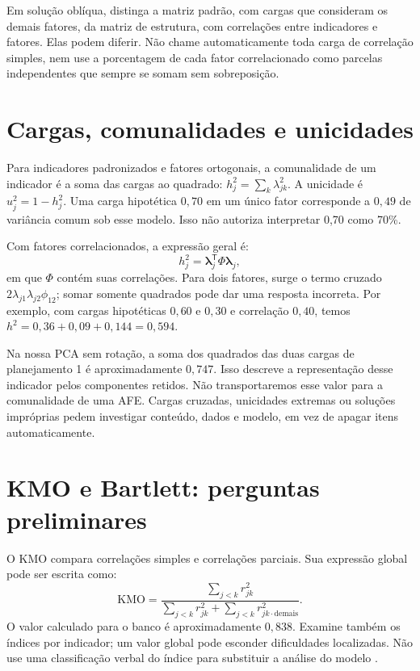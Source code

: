 Em solução oblíqua, distinga a matriz padrão, com cargas que consideram os demais fatores, da matriz de estrutura, com correlações entre indicadores e fatores. Elas podem diferir. Não chame automaticamente toda carga de correlação simples, nem use a porcentagem de cada fator correlacionado como parcelas independentes que sempre se somam sem sobreposição.

\section{Cargas, comunalidades e unicidades}

Para indicadores padronizados e fatores ortogonais, a comunalidade de um indicador é a soma das cargas ao quadrado: $h_j^2=\sum_k\lambda_{jk}^2$. A unicidade é $u_j^2=1-h_j^2$. Uma carga hipotética $0{,}70$ em um único fator corresponde a $0{,}49$ de variância comum sob esse modelo. Isso não autoriza interpretar 0,70 como 70\%.

Com fatores correlacionados, a expressão geral é:
\[
h_j^2=\boldsymbol\lambda_j^{\mathsf T}\Phi\boldsymbol\lambda_j,
\]
em que $\Phi$ contém suas correlações. Para dois fatores, surge o termo cruzado $2\lambda_{j1}\lambda_{j2}\phi_{12}$; somar somente quadrados pode dar uma resposta incorreta. Por exemplo, com cargas hipotéticas $0{,}60$ e $0{,}30$ e correlação $0{,}40$, temos $h^2=0{,}36+0{,}09+0{,}144=0{,}594$.

Na nossa PCA sem rotação, a soma dos quadrados das duas cargas de planejamento 1 é aproximadamente $0{,}747$. Isso descreve a representação desse indicador pelos componentes retidos. Não transportaremos esse valor para a comunalidade de uma AFE. Cargas cruzadas, unicidades extremas ou soluções impróprias pedem investigar conteúdo, dados e modelo, em vez de apagar itens automaticamente.

\section{KMO e Bartlett: perguntas preliminares}

O KMO compara correlações simples e correlações parciais. Sua expressão global pode ser escrita como:
\[
\mathrm{KMO}=\frac{\sum_{j<k}r_{jk}^2}
{\sum_{j<k}r_{jk}^2+\sum_{j<k}r_{jk\cdot\mathrm{demais}}^2}.
\]
O valor calculado para o banco é aproximadamente $0{,}838$. Examine também os índices por indicador; um valor global pode esconder dificuldades localizadas. Não use uma classificação verbal do índice para substituir a análise do modelo \parencite{RevelleKMO}.

